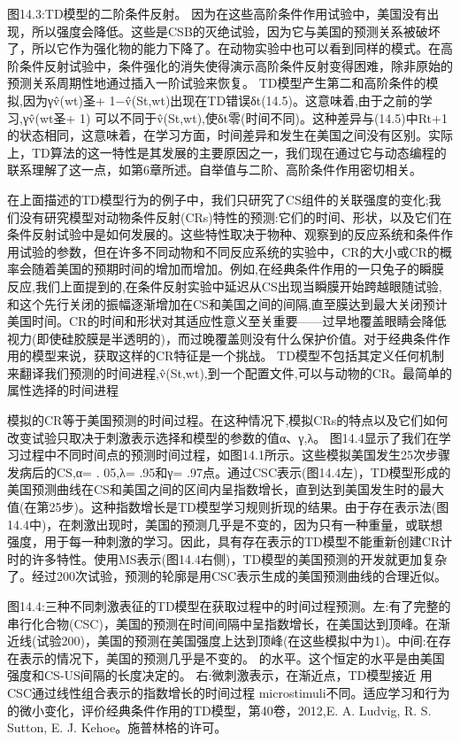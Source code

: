 图14.3:TD模型的二阶条件反射。
因为在这些高阶条件作用试验中，美国没有出现，所以强度会降低。这些是CSB的灭绝试验，因为它与美国的预测关系被破坏了，所以它作为强化物的能力下降了。在动物实验中也可以看到同样的模式。在高阶条件反射试验中，条件强化的消失使得演示高阶条件反射变得困难，除非原始的预测关系周期性地通过插入一阶试验来恢复。
TD模型产生第二和高阶条件的模拟,因为γv̂(wt)圣+ 1−v̂(St,wt)出现在TD错误δt(14.5)。这意味着,由于之前的学习,γv̂(wt圣+ 1)
可以不同于v̂(St,wt),使δt零(时间不同)。这种差异与(14.5)中Rt+1的状态相同，这意味着，在学习方面，时间差异和发生在美国之间没有区别。实际上，TD算法的这一特性是其发展的主要原因之一，我们现在通过它与动态编程的联系理解了这一点，如第6章所述。自举值与二阶、高阶条件作用密切相关。

在上面描述的TD模型行为的例子中，我们只研究了CS组件的关联强度的变化;我们没有研究模型对动物条件反射(CRs)特性的预测:它们的时间、形状，以及它们在条件反射试验中是如何发展的。这些特性取决于物种、观察到的反应系统和条件作用试验的参数，但在许多不同动物和不同反应系统的实验中，CR的大小或CR的概率会随着美国的预期时间的增加而增加。例如,在经典条件作用的一只兔子的瞬膜反应,我们上面提到的,在条件反射实验中延迟从CS出现当瞬膜开始跨越眼随试验,和这个先行关闭的振幅逐渐增加在CS和美国之间的间隔,直至膜达到最大关闭预计美国时间。CR的时间和形状对其适应性意义至关重要——过早地覆盖眼睛会降低视力(即使硅胶膜是半透明的)，而过晚覆盖则没有什么保护价值。对于经典条件作用的模型来说，获取这样的CR特征是一个挑战。
TD模型不包括其定义任何机制来翻译我们预测的时间进程,v̂(St,wt),到一个配置文件,可以与动物的CR。最简单的属性选择的时间进程

模拟的CR等于美国预测的时间过程。在这种情况下,模拟CRs的特点以及它们如何改变试验只取决于刺激表示选择和模型的参数的值α、γ,λ。
图14.4显示了我们在学习过程中不同时间点的预测时间过程，如图14.1所示。这些模拟美国发生25次步骤发病后的CS,α= . 05,λ= .95和γ= .97点。通过CSC表示(图14.4左)，TD模型形成的美国预测曲线在CS和美国之间的区间内呈指数增长，直到达到美国发生时的最大值(在第25步)。这种指数增长是TD模型学习规则折现的结果。由于存在表示法(图14.4中)，在刺激出现时，美国的预测几乎是不变的，因为只有一种重量，或联想强度，用于每一种刺激的学习。因此，具有存在表示的TD模型不能重新创建CR计时的许多特性。使用MS表示(图14.4右侧)，TD模型的美国预测的开发就更加复杂了。经过200次试验，预测的轮廓是用CSC表示生成的美国预测曲线的合理近似。

图14.4:三种不同刺激表征的TD模型在获取过程中的时间过程预测。左:有了完整的串行化合物(CSC)，美国的预测在时间间隔中呈指数增长，在美国达到顶峰。在渐近线(试验200)，美国的预测在美国强度上达到顶峰(在这些模拟中为1)。中间:在存在表示的情况下，美国的预测几乎是不变的。
的水平。这个恒定的水平是由美国强度和CS-US间隔的长度决定的。
右:微刺激表示，在渐近点，TD模型接近
用CSC通过线性组合表示的指数增长的时间过程
microstimuli不同。适应学习和行为的微小变化，评价经典条件作用的TD模型，第40卷，2012,E. A. Ludvig, R. S. Sutton, E. J. Kehoe。施普林格的许可。



